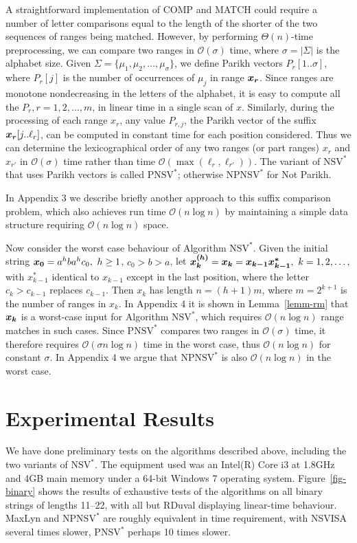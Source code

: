 \documentclass[10pt]{llncs}
\def\s#1{\mbox{\boldmath $#1$}}
\def\+{\!+\!}
\def\O{\mathcal{O}}
\def\NSV{\mbox{NSV}}
\def\PNSV{\mbox{PNSV}}
\def\NPNSV{\mbox{NPNSV}}
\begin{document}
A straightforward implementation of COMP and MATCH could require
a number of letter comparisons equal to the length of the shorter
of the two sequences of ranges being matched.
However, by performing $\Theta(n)$-time preprocessing,
we can compare two ranges in $\O(\sigma)$ time, where $\sigma = |\Sigma|$
is the alphabet size.
Given $\Sigma = \{\mu_1,\mu_2,\ldots,\mu_{\sigma}\}$,
we define Parikh vectors $P_r[1..\sigma]$,
where $P_r[j]$ is the number of occurrences of $\mu_j$ in range $\s{x_r}$.
Since ranges are monotone nondecreasing in the letters of the alphabet,
it is easy to compute all the $P_r, r = 1,2,\ldots,m$, in linear time
in a single scan of \s{x}.
Similarly, during the processing of each range \s{x_r},
any value $P_{r,j}$, the Parikh vector of the suffix $\s{x_r}[j..\ell_r]$,
can be computed in constant time for each position considered.
Thus we can determine the lexicographical order of any two ranges (or part ranges)
\s{x_r} and \s{x_{r'}} in $\O(\sigma)$ time
rather than time $\O(\max(\ell_r,\ell_{r'}))$.
The variant of $\NSV^*$ that uses Parikh vectors is called P$\NSV^*$;
otherwise NP$\NSV^*$ for Not Parikh.

In Appendix 3 we describe briefly another approach to
this suffix comparison problem, which also
achieves run time $\O(n \log n)$
by maintaining a simple data structure requiring $\O(n \log n)$ space.

Now consider the worst case behaviour of Algorithm $\NSV^*$.
Given the initial string $\s{x_0} = a^hba^hc_0,\ h \ge 1$,
$c_0 > b > a$,
let $\s{x^{(h)}_k} = \s{x_k} = \s{x_{k-1}x^*_{k-1}},\ k = 1,2,\ldots,$
with \s{x^*_{k-1}} identical to \s{x_{k-1}} except in the last position,
where the letter $c_k > c_{k-1}$ replaces $c_{k-1}$.
Then \s{x_k} has length $n = (h\+ 1)m$,
where $m = 2^{k+1}$ is the number of ranges in \s{x_k}.
In Appendix 4 it is shown in Lemma~\ref{lemm-rm}
that $\s{x_k}$
is a worst-case input for Algorithm $\NSV^*$,
which requires $\O(n\log n)$ range matches in such cases.
Since $\PNSV^*$ compares two ranges in $\O(\sigma)$ time,
it therefore requires $\O(\sigma n\log n)$ time
in the worst case, thus $\O(n\log n)$ for constant $\sigma$.
In Appendix 4 we argue that $\NPNSV^*$ is also $\O(n\log n)$
in the worst case.


\section{Experimental Results}
\label{sect-exp}
We have done preliminary tests on the algorithms described above,
including the two variants of $\NSV^*$.
The equipment used was an Intel(R) Core i3 at 1.8GHz and 4GB main memory
under a 64-bit Windows 7 operating system.
Figure~\ref{fig-binary} shows the results of exhaustive tests of the algorithms on all
binary strings of lengths 11--22,
with all but RDuval displaying linear-time behaviour.
MaxLyn and NP$\NSV^*$ are roughly equivalent in time requirement,
with NSVISA several times slower, P$\NSV^*$ perhaps 10 times slower.
\end{document}
